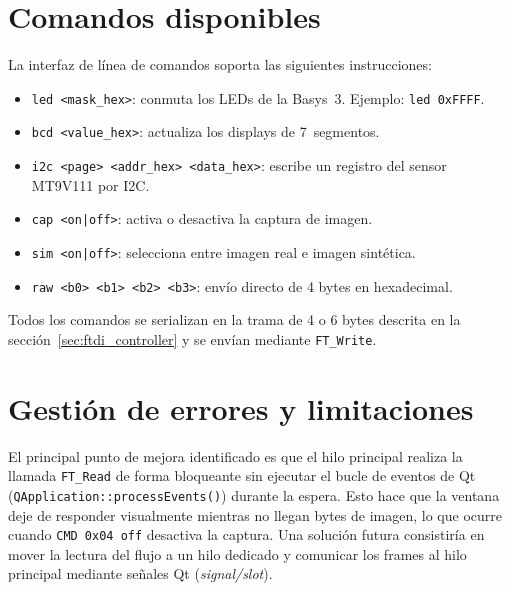 \documentclass[../main.tex]{subfiles}
\begin{document}
\section{Comandos disponibles}

La interfaz de línea de comandos soporta las siguientes instrucciones:

\begin{itemize}
    \item \texttt{led <mask\_hex>}: conmuta los LEDs de la Basys~3. Ejemplo: \texttt{led 0xFFFF}.
    \item \texttt{bcd <value\_hex>}: actualiza los displays de 7~segmentos.
    \item \texttt{i2c <page> <addr\_hex> <data\_hex>}: escribe un registro del sensor MT9V111 por I2C.
    \item \texttt{cap <on|off>}: activa o desactiva la captura de imagen.
    \item \texttt{sim <on|off>}: selecciona entre imagen real e imagen sintética.
    \item \texttt{raw <b0> <b1> <b2> <b3>}: envío directo de 4 bytes en hexadecimal.
\end{itemize}

Todos los comandos se serializan en la trama de 4 o 6 bytes descrita en la sección~\ref{sec:ftdi_controller} y se envían mediante \texttt{FT\_Write}.

\section{Gestión de errores y limitaciones}

El principal punto de mejora identificado es que el hilo principal realiza la llamada \texttt{FT\_Read} de forma bloqueante sin ejecutar el bucle de eventos de Qt (\texttt{QApplication::processEvents()}) durante la espera. Esto hace que la ventana deje de responder visualmente mientras no llegan bytes de imagen, lo que ocurre cuando \texttt{CMD 0x04 off} desactiva la captura. Una solución futura consistiría en mover la lectura del flujo a un hilo dedicado y comunicar los frames al hilo principal mediante señales Qt (\textit{signal/slot}).
\end{document}
